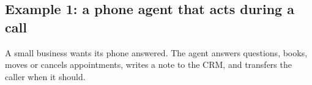 \documentclass[10pt]{article}
\newcommand{\dpmono}{\fontfamily{zi4}\selectfont}
\newcommand{\dptag}[1]{{\dpmono\tiny\color{dpmute}\MakeUppercase{#1}}}
\begin{document}
\newcommand{\exlanes}{%
  \foreach \yb/\yt/\t/\s in {2.2/3.6/MODEL/{chooses the next step}, 0.3/2.15/{CODE (RUNTIME)}/{rules, limits, tools}, -1.15/0.25/HUMAN/{approval, review}} {
    \draw[dpline, line width=0.5pt, fill=white!60!dpbg] (0,\yb) rectangle (16.2,\yt);
    \node[anchor=west, align=left, text width=1.9cm] at (0.1,{(\yb+\yt)/2}) {\dptag{\t}\\[2pt]{\color{dpmute}\s}};
  }
  \draw[dpline, line width=0.5pt] (2.1,-1.15) -- (2.1,3.6);}
\newcommand{\exlegend}[2]{%
  \begin{scope}[yshift=-1.6cm]
  \node[lab, anchor=west] at (0,0) {LEGEND};
  \node[bpev, minimum size=0.3cm] at (1.35,0) {};
  \node[bpend, minimum size=0.26cm] at (1.75,0) {};
  \node[lab, anchor=west] at (1.95,0) {start, end};
  \node[bpgw, minimum size=0.42cm] at (3.55,0) {};
  \node[lab, anchor=west] at (3.8,0) {decision, taken in its lane};
  \draw[flow] (6.75,0) -- ++(0.5,0) node[lab, right] {sequence};
  \node[#1] at (8.85,0) {};
  \node[lab, anchor=west] at (9.15,0) {the decision the fixed workflow leaves open};
  #2
  \end{scope}}

\clearpage
\subsection*{Example 1: a phone agent that acts during a call}

A small business wants its phone answered. The agent answers questions, books, moves or cancels appointments, writes a note to the CRM, and transfers the caller when it should.
\end{document}
